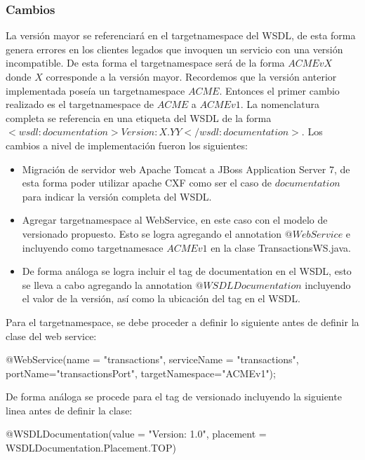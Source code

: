 \documentclass[12pt]{article}
\begin{document}
\subsubsection{Cambios}
La versión mayor se referenciará en el targetnamespace del WSDL, de esta forma genera errores en los clientes legados que invoquen un servicio con una versión incompatible. De esta forma el targetnamespace será de la forma $ACMEvX$ donde $X$ corresponde a la versión mayor. Recordemos que la versión anterior implementada poseía un targetnamespace $ACME$. Entonces el primer cambio realizado es el targetnamespace de $ACME$ a $ACMEv1$.
La nomenclatura completa se referencia en una etiqueta del WSDL de la forma $<wsdl:documentation>Version: X.YY</wsdl:documentation>$.
Los cambios a nivel de implementación fueron los siguientes:
\begin{itemize}
  \item Migración de servidor web Apache Tomcat a JBoss Application Server 7, de esta forma poder utilizar apache CXF como ser el caso de $documentation$ para indicar la versión completa del WSDL.
  \item Agregar targetnamespace al WebService, en este caso con el modelo de versionado propuesto. Esto se logra agregando el annotation $@WebService$ e incluyendo como targetnamesace $ACMEv1$ en la clase TransactionsWS.java.
  \item De forma análoga se logra incluir el tag de documentation en el WSDL, esto se lleva a cabo agregando la annotation $@WSDLDocumentation$ incluyendo el valor de la versión, así como la ubicación del tag en el WSDL.
\end{itemize}


Para el targetnamespace, se debe proceder a definir lo siguiente antes de definir la clase del web service:
\begin{center}
    @WebService(name = "transactions", serviceName = "transactions", 
                portName="transactionsPort", targetNamespace="ACMEv1");
\end{center}

De forma análoga se procede para el tag de versionado incluyendo la siguiente linea antes de definir la clase:
\begin{center}
  @WSDLDocumentation(value = "Version: 1.0", placement = WSDLDocumentation.Placement.TOP)
\end{center}
\end{document}
